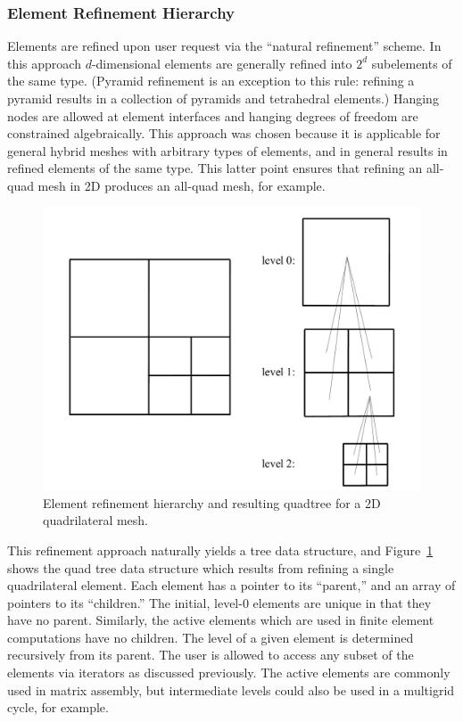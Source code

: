 \documentclass[global,twocolumn,final]{svjour}
\begin{document}
\subsubsection{Element Refinement Hierarchy\label{sec:elements_hierarchy}}
Elements are refined upon user request via the ``natural refinement''
scheme.  In this approach $d$-dimensional elements are generally
refined into $2^d$ subelements of the same type. (Pyramid refinement
is an exception to this rule: refining a pyramid results in a
collection of pyramids and tetrahedral elements.)  Hanging nodes are
allowed at element interfaces and hanging degrees of freedom are
constrained algebraically. This approach was chosen because it is
applicable for general hybrid meshes with arbitrary types of elements,
and in general results in refined elements of the same type.  This
latter point ensures that refining an all-quad mesh in 2D produces an
all-quad mesh, for example.
\begin{figure}
  \begin{center}
    \includegraphics[width=\columnwidth]{figures/hierarchy}
    \caption{Element refinement hierarchy and resulting quadtree for a 2D quadrilateral mesh.\label{fig:hierarchy}}
  \end{center}
\end{figure}

This refinement approach naturally yields a tree data structure, and
Figure~\ref{fig:hierarchy} shows the quad tree data structure which
results from refining a single quadrilateral element.  Each element
has a pointer to its ``parent,'' and an array of pointers to its
``children.''  The initial, level-0 elements are unique in that they
have no parent.  Similarly, the active elements which are used in
finite element computations have no children.  The level of a given
element is determined recursively from its parent.  The user is
allowed to access any subset of the elements via iterators as
discussed previously.  The active elements are commonly used in matrix
assembly, but intermediate levels could also be used in a multigrid
cycle, for example.
\end{document}

